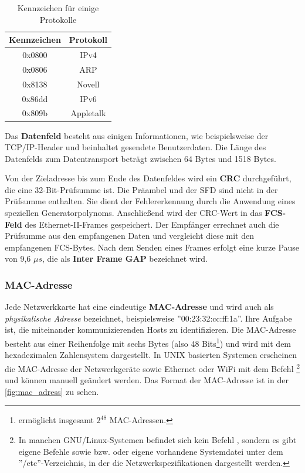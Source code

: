\begin{table}[htbp]
	\centering
	\begin{tabular}{|c|c|}\hline
	   Kennzeichen & Protokoll \\ \hline \hline
	   0x0800 & IPv4 \\ \hline
	   0x0806 & ARP \\ \hline
	   0x8138 & Novell \\ \hline
	   0x86dd & IPv6 \\ \hline
	   0x809b & Appletalk \\ \hline
	 \end{tabular}
	 \caption{Kennzeichen für einige Protokolle}\label{kennzeichen}
\end{table}

Das \textbf{Datenfeld} besteht aus einigen Informationen, wie beispielsweise der TCP/IP-Header und beinhaltet gesendete Benutzerdaten. Die Länge des Datenfelds zum Datentransport beträgt zwischen 64 Bytes und 1518 Bytes. \smallskip \smallskip

Von der Zieladresse bis zum Ende des Datenfeldes wird ein \textbf{CRC} durchgeführt, die eine 32-Bit-Prüfsumme ist. Die Präambel und der SFD sind nicht in der Prüfsumme enthalten. Sie dient der Fehlererkennung durch die Anwendung eines speziellen Generatorpolynoms. Anschließend wird der CRC-Wert in das \textbf{FCS-Feld} des Ethernet-II-Frames gespeichert. Der Empfänger errechnet auch die Prüfsumme aus den empfangenen Daten und vergleicht diese mit den empfangenen FCS-Bytes. Nach dem Senden eines Frames erfolgt eine kurze Pause von 9,6 $\mu s$, die als \textbf{Inter Frame GAP} bezeichnet wird. 

\subsubsection{MAC-Adresse}\label{subsection:mac}

Jede Netzwerkkarte hat eine eindeutige \textbf{MAC-Adresse} und wird auch als \textit{physikalische Adresse} bezeichnet, beispielsweise ''00:23:32:cc:ff:1a''. Ihre Aufgabe ist, die miteinander kommunizierenden Hosts zu identifizieren. Die MAC-Adresse besteht aus einer Reihenfolge mit sechs Bytes (also 48 Bits\footnote{ermöglicht insgesamt $2^{48}$ MAC-Adressen.}) und wird mit dem hexadezimalen Zahlensystem dargestellt. In UNIX basierten Systemen erscheinen die MAC-Adresse der Netzwerkgeräte sowie Ethernet oder WiFi mit dem Befehl \footnote{In manchen GNU/Linux-Systemen befindet sich kein Befehl , sondern es gibt eigene Befehle sowie  bzw.  oder eigene vorhandene Systemdatei unter dem ''/etc''-Verzeichnis, in der die Netzwerkspezifikationen dargestellt werden.} und können manuell geändert werden. Das Format der MAC-Adresse ist in der \autoref{fig:mac_adress} zu sehen. \smallskip \smallskip

